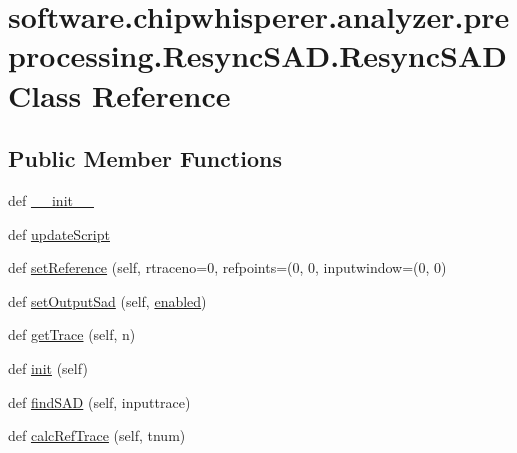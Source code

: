 \hypertarget{classsoftware_1_1chipwhisperer_1_1analyzer_1_1preprocessing_1_1ResyncSAD_1_1ResyncSAD}{}\section{software.\+chipwhisperer.\+analyzer.\+preprocessing.\+Resync\+S\+A\+D.\+Resync\+S\+A\+D Class Reference}
\label{classsoftware_1_1chipwhisperer_1_1analyzer_1_1preprocessing_1_1ResyncSAD_1_1ResyncSAD}
\subsection*{Public Member Functions}
\begin{DoxyCompactItemize}
\item 
def \hyperlink{classsoftware_1_1chipwhisperer_1_1analyzer_1_1preprocessing_1_1ResyncSAD_1_1ResyncSAD_a0929e9f7dcf33569ad88c357db33da89}{\+\_\+\+\_\+init\+\_\+\+\_\+}
\item 
def \hyperlink{classsoftware_1_1chipwhisperer_1_1analyzer_1_1preprocessing_1_1ResyncSAD_1_1ResyncSAD_a9b8406e13c9a53ae9d888d7d63f5c96e}{update\+Script}
\item 
def \hyperlink{classsoftware_1_1chipwhisperer_1_1analyzer_1_1preprocessing_1_1ResyncSAD_1_1ResyncSAD_a370b0acff7145ffc0d1999eddd2463bd}{set\+Reference} (self, rtraceno=0, refpoints=(0, 0, inputwindow=(0, 0)
\item 
def \hyperlink{classsoftware_1_1chipwhisperer_1_1analyzer_1_1preprocessing_1_1ResyncSAD_1_1ResyncSAD_aa552a2ef6cf25865970e212b5ef2bf16}{set\+Output\+Sad} (self, \hyperlink{classsoftware_1_1chipwhisperer_1_1analyzer_1_1preprocessing_1_1ResyncSAD_1_1ResyncSAD_a304d6b656be9ef188c29bffbea7d302e}{enabled})
\item 
def \hyperlink{classsoftware_1_1chipwhisperer_1_1analyzer_1_1preprocessing_1_1ResyncSAD_1_1ResyncSAD_afb6f303dff4f70f13310d504ce86e9e5}{get\+Trace} (self, n)
\item 
def \hyperlink{classsoftware_1_1chipwhisperer_1_1analyzer_1_1preprocessing_1_1ResyncSAD_1_1ResyncSAD_a76c56138e0ca04f7164c729c5dfd7e46}{init} (self)
\item 
def \hyperlink{classsoftware_1_1chipwhisperer_1_1analyzer_1_1preprocessing_1_1ResyncSAD_1_1ResyncSAD_afd3bb54b9e47e70f113dac601d369aff}{find\+S\+A\+D} (self, inputtrace)
\item 
def \hyperlink{classsoftware_1_1chipwhisperer_1_1analyzer_1_1preprocessing_1_1ResyncSAD_1_1ResyncSAD_a405b8342d678f6ac3203706f93b367c2}{calc\+Ref\+Trace} (self, tnum)
\end{DoxyCompactItemize}
